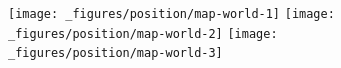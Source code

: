 \begin{itemize}
\begin{Shaded}
\begin{Highlighting}[]
\OperatorTok{+}\StringTok{ }\NormalTok{()}
\OperatorTok{+}\StringTok{ }\NormalTok{(}\NormalTok{)}
\OperatorTok{+}\StringTok{ }\NormalTok{(}\NormalTok{)}
\end{Highlighting}
\end{Shaded}

  \begin{figure}[H]
    \texttt{[image: \_figures/position/map-world-1]}%
    \texttt{[image: \_figures/position/map-world-2]}%
    \texttt{[image: \_figures/position/map-world-3]}
  \end{figure}
\end{itemize}

